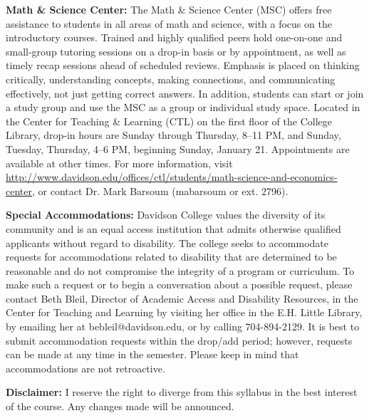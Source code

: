 \documentclass[11pt, a4paper]{article}
\begin{document}
\vspace*{0.5em}
\noindent\textbf{Math \& Science Center:}
The Math \& Science Center (MSC) offers free assistance to students in all areas of math and science, with a focus on the introductory courses. Trained and highly qualified peers hold one-on-one and small-group tutoring sessions on a drop-in basis or by appointment, as well as timely recap sessions ahead of scheduled reviews. Emphasis is placed on thinking critically, understanding concepts, making connections, and communicating effectively, not just getting correct answers. In addition, students can start or join a study group and use the MSC as a group or individual study space. Located in the Center for Teaching \& Learning (CTL) on the first floor of the College Library, drop-in hours are Sunday through Thursday, 8--11 PM, and Sunday, Tuesday, Thursday, 4--6 PM, beginning Sunday, January 21. Appointments are available at other times. For more information, visit \url{http://www.davidson.edu/offices/ctl/students/math-science-and-economics-center}, or contact Dr. Mark Barsoum (mabarsoum or ext. 2796).

\vspace*{0.5em}
\noindent\textbf{Special Accommodations:}
Davidson College values the diversity of its community and is an equal access institution that admits otherwise qualified applicants without regard to disability.  The college seeks to accommodate requests for accommodations related to disability that are determined to be reasonable and do not compromise the integrity of a program or curriculum. To make such a request or to begin a conversation about a possible request, please contact Beth Bleil, Director of Academic Access and Disability Resources, in the Center for Teaching and Learning by visiting her office in the E.H. Little Library, by emailing her at bebleil@davidson.edu, or by calling 704-894-2129.  It is best to submit accommodation requests within the drop/add period; however, requests can be made at any time in the semester.  Please keep in mind that accommodations are not retroactive.

\vspace*{0.5em}
\noindent\textbf{Disclaimer:}
I reserve the right to diverge from this syllabus in the best interest of the course. Any changes made will be announced. 
\end{document}
